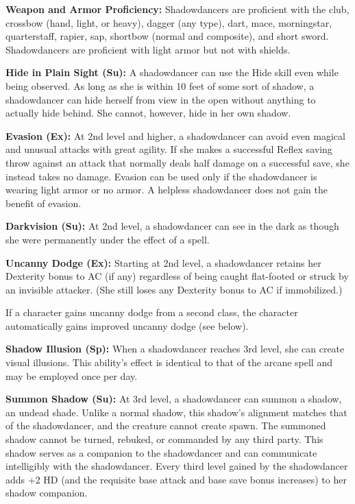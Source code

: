 {
\textbf{Weapon and Armor Proficiency:} Shadowdancers are proficient with the club, crossbow (hand, light, or heavy), dagger (any type), dart, mace, morningstar, quarterstaff, rapier, sap, shortbow (normal and composite), and short sword. Shadowdancers are proficient with light armor but not with shields.

\textbf{Hide in Plain Sight (Su):} A shadowdancer can use the Hide skill even while being observed. As long as she is within 10 feet of some sort of shadow, a shadowdancer can hide herself from view in the open without anything to actually hide behind. She cannot, however, hide in her own shadow.

\textbf{Evasion (Ex):} At 2nd level and higher, a shadowdancer can avoid even magical and unusual attacks with great agility. If she makes a successful Reflex saving throw against an attack that normally deals half damage on a successful save, she instead takes no damage. Evasion can be used only if the shadowdancer is wearing light armor or no armor. A helpless shadowdancer does not gain the benefit of evasion.

\textbf{Darkvision (Su):} At 2nd level, a shadowdancer can see in the dark as though she were permanently under the effect of a  spell.

\textbf{Uncanny Dodge (Ex):} Starting at 2nd level, a shadowdancer retains her Dexterity bonus to AC (if any) regardless of being caught flat-footed or struck by an invisible attacker. (She still loses any Dexterity bonus to AC if immobilized.)

If a character gains uncanny dodge from a second class, the character automatically gains improved uncanny dodge (see below).

\textbf{Shadow Illusion (Sp):} When a shadowdancer reaches 3rd level, she can create visual illusions. This ability's effect is identical to that of the arcane spell  and may be employed once per day.

\textbf{Summon Shadow (Su):} At 3rd level, a shadowdancer can summon a shadow, an undead shade. Unlike a normal shadow, this shadow's alignment matches that of the shadowdancer, and the creature cannot create spawn. The summoned shadow cannot be turned, rebuked, or commanded by any third party. This shadow serves as a companion to the shadowdancer and can communicate intelligibly with the shadowdancer. Every third level gained by the shadowdancer adds +2 HD (and the requisite base attack and base save bonus increases) to her shadow companion.

}
